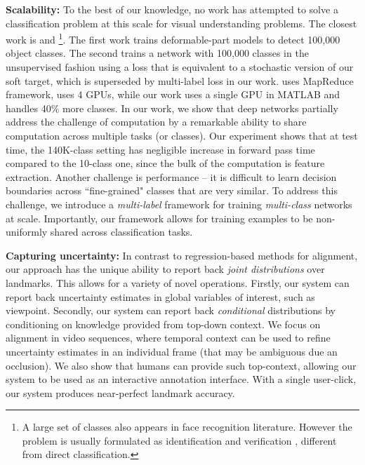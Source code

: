 \documentclass[letterpaper]{article} %
\begin{document}
{\bf Scalability:} To the best of our knowledge, no work has attempted to solve a classification problem at this scale for visual understanding problems. The closest work is \cite{Dean2013FastAD} and \cite{joulin2016learning} \footnote{A large set of classes also appears in face recognition literature. However the problem is usually formulated as identification and verification \cite{KemelmacherShlizerman2016TheMB}, different from direct classification.}.
The first work trains deformable-part models to detect 100,000 object classes. The second trains a network with 100,000 classes in the unsupervised fashion using a loss that is equivalent to a stochastic version of our soft target, which is superseded by multi-label loss in our work. \cite{Dean2013FastAD} uses MapReduce framework, \cite{joulin2016learning} uses 4 GPUs, while our work uses a single GPU in MATLAB and handles 40\% more classes. In our work, we show that deep networks partially address the challenge of computation
by a remarkable ability to share computation across multiple tasks (or classes). Our experiment shows that at test time, the 140K-class setting has negligible increase in forward pass time compared to the 10-class one, since the bulk of the computation is feature extraction. Another challenge is performance -- it is difficult to learn decision boundaries across ``fine-grained" classes that are very similar. To address this challenge, we introduce a {\em multi-label} framework for training {\em multi-class} networks at scale. Importantly, our framework allows for training examples to be non-uniformly shared across classification tasks. %

{\bf Capturing uncertainty:} In contrast to regression-based methods for alignment, our approach has the unique ability to report back {\em joint distributions} over landmarks. This allows for a variety of novel operations. Firstly, our system can report back uncertainty estimates in global variables of interest, such as viewpoint. Secondly, our system can report back {\em conditional} distributions by conditioning on knowledge provided from top-down context. We focus on alignment in video sequences, where temporal context can be used to refine uncertainty estimates in an individual frame (that may be ambiguous due an occlusion). We also show that humans can provide such top-context, allowing our system to be used as an interactive annotation interface. With a single user-click, our system produces near-perfect landmark accuracy.
\end{document}
